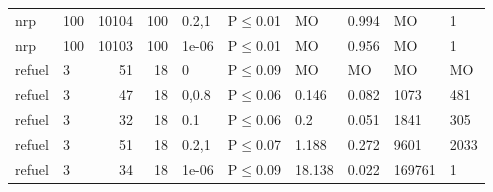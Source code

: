 \begin{longtable}{llrrllllll}
 nrp           & 100      &  	10104 & 100 & 0.2,1 & P$\leq$0.01  & MO       & 0.994    & MO      & 1       \\
 nrp           & 100      &  	10103 & 100 & 1e-06 & P$\leq$0.01  & MO       & 0.956    & MO      & 1       \\
 refuel        & 3        &     	51 &  18 & 0     & P$\leq$0.09  & MO       & MO       & MO      & MO      \\
 refuel        & 3        &     	47 &  18 & 0,0.8 & P$\leq$0.06  & 0.146    & 0.082    & 1073    & 481     \\
 refuel        & 3        &     	32 &  18 & 0.1   & P$\leq$0.06  & 0.2      & 0.051    & 1841    & 305     \\
 refuel        & 3        &     	51 &  18 & 0.2,1 & P$\leq$0.07  & 1.188    & 0.272    & 9601    & 2033    \\
 refuel        & 3        &     	34 &  18 & 1e-06 & P$\leq$0.09  & 18.138   & 0.022    & 169761  & 1       \\
\bottomrule
\end{longtable}
